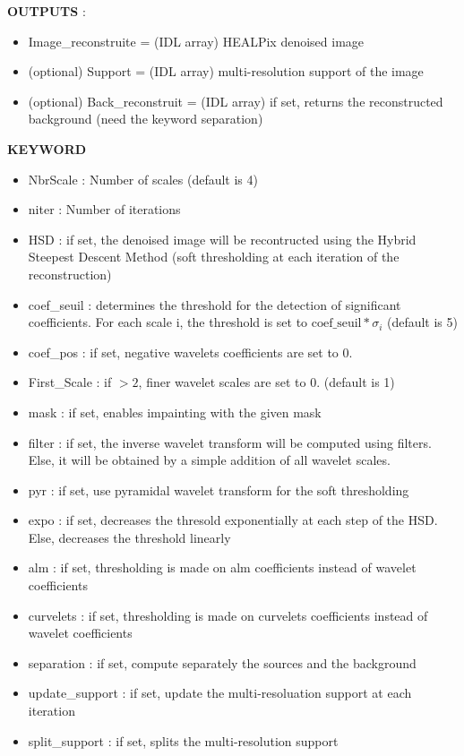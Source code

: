 \textbf{OUTPUTS} : 
\begin{itemize}
\item{Image\_reconstruite = (IDL array) HEALPix denoised image}
\item{(optional) Support = (IDL array) multi-resolution support of the image}
\item{(optional) Back\_reconstruit = (IDL array) if set, returns the reconstructed background (need the keyword separation)}
\end{itemize}

\textbf{KEYWORD}

\begin{itemize}
  \item NbrScale  : Number of scales (default is 4)
  \item niter  : Number of iterations
  \item HSD  : if set, the denoised image will be recontructed using the Hybrid Steepest Descent Method (soft thresholding at each iteration of the reconstruction)
  \item  coef\_seuil  : determines the threshold for the detection of significant coefficients. For each scale i, the threshold is set to $\text{coef\_seuil}*\sigma_i$ (default is 5)
  \item coef\_pos  : if set, negative wavelets coefficients are set to 0.
  \item  First\_Scale  : if $> 2$, finer wavelet scales are set to 0. (default is 1)
  \item  mask  : if set, enables impainting with the given mask
  \item filter  : if set, the inverse wavelet transform will be computed using filters. Else, it will be obtained by a simple addition of all wavelet scales.
  \item pyr  : if set, use pyramidal wavelet transform for the soft thresholding
  \item expo  : if set, decreases the thresold exponentially at each step of the HSD. Else, decreases the threshold linearly
  \item alm : if set, thresholding is made on alm coefficients instead of wavelet coefficients
  \item  curvelets : if set, thresholding is made on curvelets coefficients instead of wavelet coefficients
  \item  separation : if set, compute separately the sources and the background
  \item  update\_support : if set, update the multi-resoluation support at each iteration
  \item  split\_support : if set, splits the multi-resolution support
\end{itemize}




